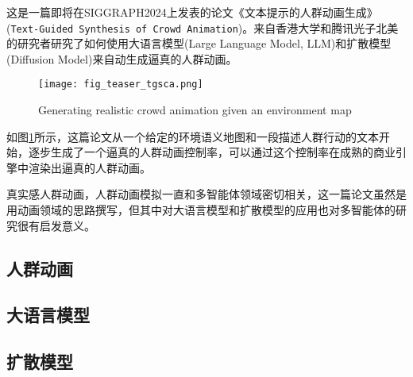 这是一篇即将在SIGGRAPH2024上发表的论文《文本提示的人群动画生成》(\texttt{Text-Guided Synthesis of Crowd Animation})。来自香港大学和腾讯光子北美的研究者研究了如何使用大语言模型(Large Language Model, LLM)和扩散模型(Diffusion Model)来自动生成逼真的人群动画。

\begin{figure}[H]
    \texttt{[image: fig\_teaser\_tgsca.png]}
    \caption{Generating realistic crowd animation given an environment map}
    \label{fig:teaser_tgsca}
\end{figure}

如图\ref{fig:teaser_tgsca}所示，这篇论文从一个给定的环境语义地图和一段描述人群行动的文本开始，逐步生成了一个逼真的人群动画控制率，可以通过这个控制率在成熟的商业引擎中渲染出逼真的人群动画。

真实感人群动画，人群动画模拟一直和多智能体领域密切相关，这一篇论文虽然是用动画领域的思路撰写，但其中对大语言模型和扩散模型的应用也对多智能体的研究很有启发意义。

\subsection{人群动画}

\subsection{大语言模型}

\subsection{扩散模型}

